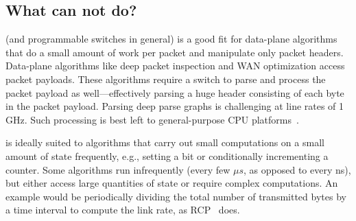 \subsection{What can \absmachine not do?}
\label{ss:limitations}

\absmachine (and programmable switches in general) is a good fit for data-plane
algorithms that do a small amount of work per packet and manipulate only packet
headers. Data-plane algorithms like deep packet inspection and WAN optimization
access packet payloads. These algorithms require a switch to parse and process
the packet payload as well---effectively parsing a huge header consisting of
each byte in the packet payload. Parsing deep parse graphs is challenging at
line rates of 1 GHz. Such processing is best left to general-purpose CPU
platforms~\cite{e2, aplomb, opennf}.

\absmachine is ideally suited to algorithms that carry out small computations
on a small amount of state frequently, e.g., setting a bit or conditionally
incrementing a counter. Some algorithms run infrequently (every few $\mu s$, as
opposed to every ns), but either access large quantities of state or require
complex computations. An example would be periodically dividing the total
number of transmitted bytes by a time interval to compute the link rate, as RCP~\cite{rcp}
does.
